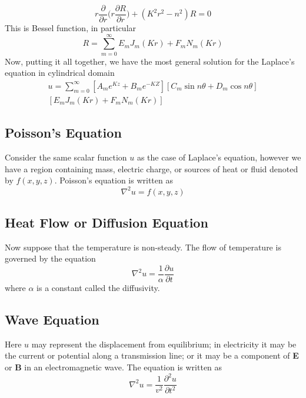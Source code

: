 \documentclass[../main.tex]{subfiles}
\begin{document}
\begin{equation*}
    r\frac{\partial}{\partial r}\Biggl(r\frac{\partial R}{\partial r}\Biggr)
    +(K^2r^2-n^2)R=0
\end{equation*}
This is Bessel function, in particular
\begin{equation*}
    R=\sum_{m=0}^{\infty}E_mJ_m(Kr)+F_mN_m(Kr)
\end{equation*}
Now, putting it all together, we have the most general solution for the Laplace's equation in cylindrical domain 
\begin{multline*}
    u=\sum_{m=0}^{\infty}\left[A_me^{Kz}+B_me^{-KZ}\right]\left[C_m\sin n\theta +D_m\cos n\theta\right]\\
    \left[E_mJ_m(Kr)+F_mN_m(Kr)\right]
\end{multline*}

\subsection*{Poisson’s Equation}
Consider the same scalar function $u$ as the case of Laplace's equation, however we have a region containing mass, electric charge, or sources of heat or fluid denoted by $f(x,y,z)$. Poisson's equation is written as 
\begin{equation*}
    \nabla^2 u=f(x,y,z)
\end{equation*}

\subsection*{Heat Flow or Diffusion Equation}
Now suppose that the temperature is non-steady. The flow of temperature is governed by the equation 
\begin{equation*}
    \nabla^2 u=\frac{1}{\alpha}\frac{\partial u}{\partial t}
\end{equation*}
where $\alpha$ is a constant called the diﬀusivity.

\subsection*{Wave Equation}
Here $u$ may represent the displacement from equilibrium; in electricity it may be the current or potential along a transmission line; or it may be a component of \textbf{E} or \textbf{B} in an electromagnetic wave. The equation is written as 
\begin{equation*}
    \nabla^2u=\frac{1}{v^2}\frac{\partial^2u}{\partial t^2}
\end{equation*}
\end{document}

